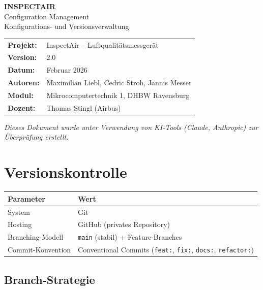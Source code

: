 \documentclass[a4paper,11pt]{article}
\begin{document}
\begin{center}
{\LARGE\textbf{INSPECTAIR}}\\[0.3cm]
{\Large Configuration Management}\\[0.3cm]
{\large Konfigurations- und Versionsverwaltung}\\[0.5cm]
\begin{tabular}{ll}
\textbf{Projekt:} & InspectAir -- Luftqualitätsmessgerät \\
\textbf{Version:} & 2.0 \\
\textbf{Datum:} & Februar 2026 \\
\textbf{Autoren:} & Maximilian Liebl, Cedric Stroh, Jannis Messer \\
\textbf{Modul:} & Mikrocomputertechnik 1, DHBW Ravensburg \\
\textbf{Dozent:} & Thomas Stingl (Airbus) \\
\end{tabular}
\end{center}

\vspace{0.5cm}
\noindent\textit{Dieses Dokument wurde unter Verwendung von KI-Tools (Claude, Anthropic) zur Überprüfung erstellt.}
\vspace{0.3cm}

\tableofcontents
\newpage

\section{Versionskontrolle}

\begin{tabularx}{\textwidth}{lX}
\toprule
\rowcolor{tableheader}
\textbf{Parameter} & \textbf{Wert} \\
\midrule
System & Git \\
Hosting & GitHub (privates Repository) \\
Branching-Modell & \texttt{main} (stabil) + Feature-Branches \\
Commit-Konvention & Conventional Commits (\texttt{feat:}, \texttt{fix:}, \texttt{docs:}, \texttt{refactor:}) \\
\bottomrule
\end{tabularx}

\subsection{Branch-Strategie}
\end{document}
